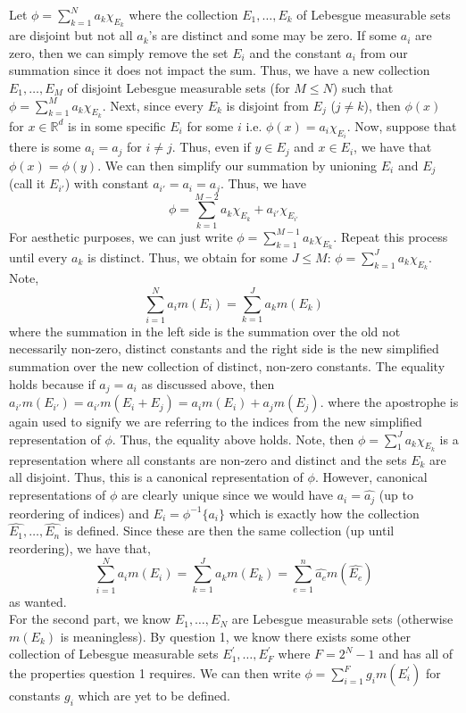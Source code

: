 \documentclass[12pt]{article}
\newcommand{\R}{\mathbb{R}}
\newenvironment{solution}[2][Solution]{\begin{trivlist}
\item[\hskip \labelsep {\bfseries #1}]}{\end{trivlist}}
\begin{document}
\begin{solution}
    sLet $\phi = \sum_{k=1}^N a_k\chi_{E_k}$ where the collection $E_1,\hdots,E_k$ of Lebesgue measurable sets are disjoint but
    not all $a_k$'s are distinct and some may be zero. If some $a_i$ are zero, then we can simply remove the set $E_i$ and the constant
    $a_i$ from our summation since it does not impact the sum. Thus, we have a new collection $E_1,\hdots,E_M$ of disjoint Lebesgue
    measurable sets (for $M\leq N$) such that $\phi = \sum_{k=1}^M a_k\chi_{E_k}$. Next, since every $E_k$ is disjoint from $E_j$
    ($j\neq k$), then $\phi(x)$ for $x\in\R^d$ is in some specific $E_i$ for some $i$ i.e. $\phi(x) = a_i\chi_{E_i}$. Now, suppose
    that there is some $a_i = a_j$ for $i\neq j$. Thus, even if $y\in E_j$ and $x\in E_i$, we have that $\phi(x) = \phi(y)$.
    We can then simplify our summation by unioning $E_i$ and $E_j$ (call it $E_{i'}$) with constant $a_{i'}=a_i=a_j$. Thus, we have
    \[ \phi = \sum_{k=1}^{M-2} a_k\chi_{E_k} + a_{i'}\chi_{E_{i'}} \]
    For aesthetic purposes, we can just write $\phi = \sum_{k=1}^{M-1} a_k\chi_{E_k}$. Repeat this process until every $a_k$
    is distinct. Thus, we obtain for some $J\leq M$: $\phi = \sum_{k=1}^J a_k\chi_{E_k}$. Note,
    \[ \sum_{i=1}^N a_im(E_i) = \sum_{k=1}^J a_km(E_k) \]
    where the summation in the left side is the summation over the old not necessarily non-zero, distinct constants and the right
    side is the new simplified summation over the new collection of distinct, non-zero constants. The equality holds because
    if $a_j = a_i$ as discussed above, then $a_{i'}m(E_{i'}) = a_{i'}m(E_i + E_j) = a_im(E_i) + a_jm(E_j)$.
    where the apostrophe is again used to signify we are referring to the indices from the new simplified representation of $\phi$.
    Thus, the equality above holds. Note, then $\phi = \sum_1^J a_k\chi_{E_k}$ is a representation where all constants are
    non-zero and distinct and the sets $E_k$ are all disjoint. Thus, this is a canonical representation of $\phi$. However,
    canonical representations of $\phi$ are clearly unique since we would have $a_i = \hat{a_j}$ (up to reordering of indices) and
    $E_i = \phi^{-1}\{a_i\}$ which is exactly how the collection $\hat{E_1},\hdots,\hat{E_n}$ is defined. Since these are then the same
    collection (up until reordering), we have that,
    \[ \sum_{i=1}^N a_im(E_i) = \sum_{k=1}^J a_km(E_k) = \sum_{e=1}^n \hat{a_e}m(\hat{E_e}) \]
    as wanted.\\


    For the second part, we know $E_1,\hdots, E_N$ are Lebesgue measurable sets (otherwise $m(E_k)$ is meaningless). By question 1,
    we know there exists some other collection of Lebesgue measurable sets $E_1^{'},\hdots,E_F^{'}$ where $F = 2^{N} -1$ and has all of
    the properties question 1 requires. We can then write $\phi = \sum_{i=1}^F g_i m(E_i^{'})$ for constants $g_i$ which are yet to
    be defined.\\


\end{solution}
\end{document}
